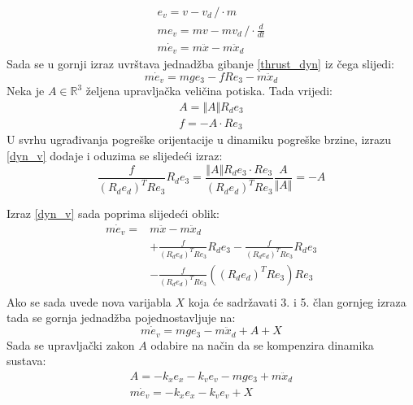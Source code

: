 \documentclass[times, utf8, diplomski, numeric]{fer}
\begin{document}
	\begin{gather*}
		e_v = v - v_d \,/ \cdot m \\
		me_v = mv - mv_d \, / \cdot \frac{d}{dt} \\
		m\dot{e}_v = m \ddot{x} - m\ddot{x}_d
	\end{gather*}
	Sada se u gornji izraz uvrštava jednadžba gibanje \ref{thrust_dyn} iz čega slijedi:
	\begin{equation}
		m\dot{e}_v = mge_3 - fRe_3 - m\ddot{x}_d \label{dyn_v}
	\end{equation}
	Neka je $A\in\mathbb{R}^3$ željena upravljačka veličina potiska. Tada vrijedi:
	\begin{gather}
		A = \Vert A \Vert R_d e_3 \\
		f = - A \cdot Re_3
	\end{gather}
	U svrhu ugrađivanja pogreške orijentacije u dinamiku pogreške brzine, izrazu \ref{dyn_v} dodaje i oduzima se slijedeći izraz:
	\begin{equation}
		\frac{f}{(R_de_d)^TRe_3}R_d e_3 = \frac{\Vert A \Vert R_d e_3 \cdot Re_3}{(R_de_d)^TRe_3}\frac{A}{\Vert A \Vert} = - A
	\end{equation}
	
	Izraz \ref{dyn_v} sada poprima slijedeći oblik:
	\begin{align*}
		m\dot{e}_v =& m \ddot{x} - m\ddot{x}_d \\
		& + \frac{f}{(R_de_d)^TRe_3}R_d e_3 - \frac{f}{(R_de_d)^TRe_3}R_d e_3 \\
		& - \frac{f}{(R_de_d)^TRe_3}((R_de_d)^TRe_3)Re_3 \\
	\end{align*}
	Ako se sada uvede nova varijabla $X$ koja će sadržavati 3. i 5. član gornjeg izraza tada se gornja jednadžba pojednostavljuje na:
	\begin{equation*}
		m\dot{e}_v = mge_3 - m\ddot{x}_d + A + X
	\end{equation*}
	Sada se upravljački zakon $A$ odabire na način da se kompenzira dinamika sustava: 
	\begin{gather}
		A = -k_x e_x - k_ve_v - mge_3 + m\ddot{x}_d \\
		m\dot{e}_v = -k_x e_x - k_v e_v + X \label{lin_dyn}
	\end{gather}
	
	\newpage
	\clearpage
	
\end{document}
